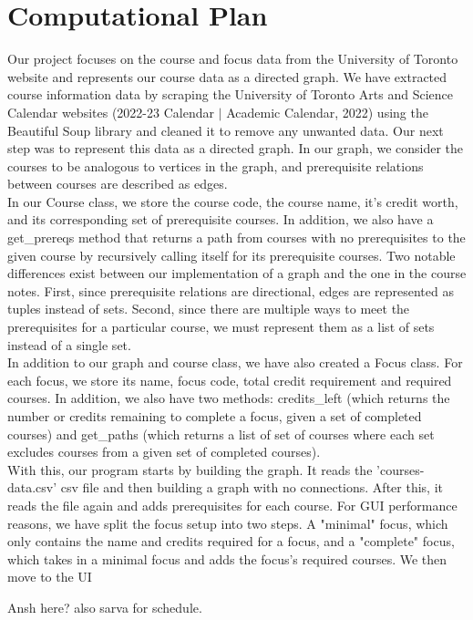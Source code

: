 \documentclass[fontsize=11pt]{article}
\begin{document}
\section*{Computational Plan}
Our project focuses on the course and focus data from the University of Toronto website and represents our course data as a directed graph. We have extracted course information data by scraping the University of Toronto Arts and Science Calendar websites (2022-23 Calendar $\vert$ Academic Calendar, 2022) using the Beautiful Soup library and cleaned it to remove any unwanted data. Our next step was to represent this data as a directed graph. In our graph, we consider the courses to be analogous to vertices in the graph, and prerequisite relations between courses are described as edges. \\
In our Course class, we store the course code, the course name, it's credit worth, and its corresponding set of prerequisite courses. In addition, we also have a get\_prereqs method that returns a path from courses with no prerequisites to the given course by recursively calling itself for its prerequisite courses. Two notable differences exist between our implementation of a graph and the one in the course notes. First, since prerequisite relations are directional, edges are represented as tuples instead of sets. Second, since there are multiple ways to meet the prerequisites for a particular course, we must represent them as a list of sets instead of a single set.
\\ In addition to our graph and course class, we have also created a Focus class. For each focus, we store its name, focus code, total credit requirement and required courses. In addition, we also have two methods: credits\_left (which returns the number or credits remaining to complete a focus, given a set of completed courses) and get\_paths (which returns a list of set of courses where each set excludes courses from a given set of completed courses). 
\\ With this, our program starts by building the graph. It reads the 'courses-data.csv' csv file and then building a graph with no connections. After this, it reads the file again and adds prerequisites for each course. For GUI performance reasons, we have split the focus setup into two steps. A "minimal" focus, which only contains the name and credits required for a focus, and a "complete" focus, which takes in a minimal focus and adds the focus's required courses.
We then move to the UI\\
\begin{huge} Ansh here?
also sarva for schedule.
\end{huge}
\end{document}
